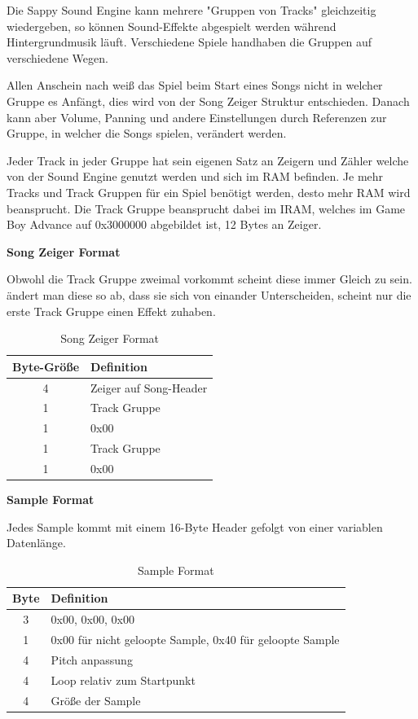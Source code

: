 \documentclass[11pt,a4paper]{scrartcl}
\newcommand{\paratitle}[1] {
    \vspace{5mm}
    \large \textbf{#1} \normalsize
    \vspace{2mm}\newline
}
\begin{document}
Die Sappy Sound Engine kann mehrere "Gruppen von Tracks" gleichzeitig wiedergeben, so k\"onnen Sound-Effekte abgespielt werden w\"ahrend Hintergrundmusik l\"auft. Verschiedene Spiele handhaben die Gruppen auf verschiedene Wegen.

Allen Anschein nach wei{\ss} das Spiel beim Start eines Songs nicht in welcher Gruppe es Anf\"angt, dies wird von der Song Zeiger Struktur entschieden. Danach kann aber Volume, Panning und andere Einstellungen durch Referenzen zur Gruppe, in welcher die Songs spielen, ver\"andert werden.

Jeder Track in jeder Gruppe hat sein eigenen Satz an Zeigern und Z\"ahler welche von der Sound Engine genutzt werden und sich im RAM befinden. Je mehr Tracks und Track Gruppen f\"ur ein Spiel ben\"otigt werden, desto mehr RAM wird beansprucht.\newline
Die Track Gruppe beansprucht dabei im IRAM, welches im Game Boy Advance auf 0x3000000 abgebildet ist, 12 Bytes an Zeiger. 


\paratitle{Song Zeiger Format}
Obwohl die Track Gruppe zweimal vorkommt scheint diese immer Gleich zu sein. \"andert man diese so ab, dass sie sich von einander Unterscheiden, scheint nur die erste Track Gruppe einen Effekt zuhaben.

\begin{table}[h]
    \centering
    \begin{tabular}{ c | p{8cm} }
        \textbf{Byte-Gr\"o{\ss}e} & \textbf{Definition}\\
        \hline
        4 & Zeiger auf Song-Header\\
				\hline
        1 & Track Gruppe\\
				\hline
        1 & 0x00\\
				\hline
        1 & Track Gruppe\\
				\hline
        1 & 0x00\\
    \end{tabular}
    \caption{Song Zeiger Format}
    \label{table:SongZeiger}
\end{table}


\newpage
\paratitle{Sample Format}
Jedes Sample kommt mit einem 16-Byte Header gefolgt von einer variablen Datenl\"ange.

\begin{table}[h]
    \centering
    \begin{tabular}{ c | p{15cm} }
        \textbf{Byte} & \textbf{Definition}\\
				\hline
        3 & 0x00, 0x00, 0x00\\
				\hline
        1 & 0x00 f\"ur nicht geloopte Sample, 0x40 f\"ur geloopte Sample\\
				\hline
        4 & Pitch anpassung\\
				\hline
        4 & Loop relativ zum Startpunkt\\
				\hline
        4 & Gr\"o{\ss}e der Sample\\
    \end{tabular}
    \caption{Sample Format}
    \label{table:SampleFormat}
\end{table}
\end{document}
